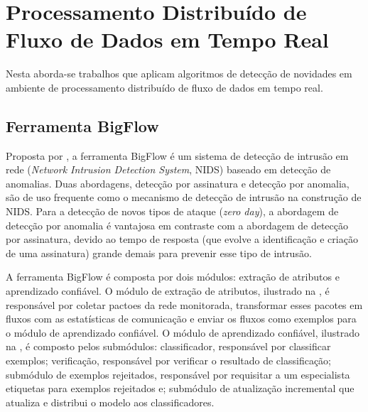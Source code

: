 




\section{Processamento Distribuído de Fluxo de Dados em Tempo Real}

Nesta \Section aborda-se trabalhos que aplicam algoritmos de detecção de
novidades em ambiente de processamento distribuído de fluxo de dados em tempo
real.

\subsection{Ferramenta BigFlow}

Proposta por , a ferramenta BigFlow é um sistema de
detecção de intrusão em rede (\emph{Network Intrusion Detection System}, NIDS)
baseado em detecção de anomalias.
Duas abordagens, detecção por assinatura e detecção por anomalia, são de uso
frequente como o mecanismo de detecção de intrusão na construção de NIDS.
Para a detecção de novos tipos de ataque (\emph{zero day}), a abordagem de
detecção por anomalia é vantajosa em contraste com a abordagem de detecção por
assinatura, devido ao tempo de resposta (que evolve a identificação e criação de
uma assinatura) grande demais para prevenir esse tipo de intrusão.

A ferramenta BigFlow é composta por dois módulos: extração de atributos e aprendizado confiável.
O módulo de extração de atributos, ilustrado na ,
é responsável por coletar pactoes da rede monitorada, transformar esses
pacotes em fluxos com as estatísticas de comunicação e enviar os fluxos como
exemplos para o módulo de aprendizado confiável.
O módulo de aprendizado confiável, ilustrado na , é composto pelos submódulos:
classificador, responsável por classificar exemplos;
verificação, responsável por verificar o resultado de classificação;
submódulo de exemplos rejeitados, responsável por requisitar a um especialista etiquetas para exemplos rejeitados e;
submódulo de atualização incremental que atualiza e distribui o modelo aos classificadores.

